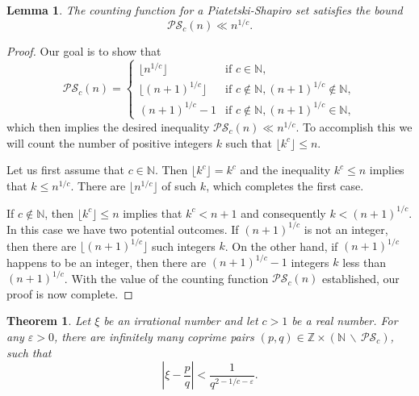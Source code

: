 \documentclass[reqno]{amsart}
\newtheorem{theorem}{Theorem}
\newtheorem{lemma}{Lemma}
\theoremstyle{definition}
\begin{document}
\begin{lemma}\label{lemma:ps_seq}
    The counting function for a Piatetski-Shapiro set satisfies the bound
    \begin{equation*}
    \mathcal{PS}_{c}(n) \ll n^{1/c}.
\end{equation*}
\end{lemma}
\begin{proof}
Our goal is to show that
\begin{equation*}
    \mathcal{PS}_{c}(n) = \begin{cases}
        \lfloor{n^{1/c}}\rfloor &\text{if } c \in \mathbb{N}, \\
        \lfloor{(n+1)^{1/c}}\rfloor &\text{if } c \not\in \mathbb{N}, (n+1)^{1/c} \not \in \mathbb{N}, \\
        (n+1)^{1/c} - 1 &\text{if } c \not\in \mathbb{N}, (n+1)^{1/c} \in \mathbb{N},
    \end{cases}
\end{equation*}
which then implies the desired inequality $\mathcal{PS}_{c}(n) \ll n^{1/c}$.  To accomplish this we will count the number of positive integers $k$ such that $\lfloor{k^{c}}\rfloor \leq n$.

Let us first assume that $c \in \mathbb{N}$.  Then $\lfloor{k^{c}}\rfloor = k^{c}$ and the inequality $k^{c} \leq n$ implies that $k \leq  n^{1/c}$.  There are $\lfloor{n^{1/c}}\rfloor$ of such $k$, which completes the first case.  

If $c \notin \mathbb{N}$, then $\lfloor{k^{c}}\rfloor \leq n$ implies that $k^{c} < n + 1$ and consequently $k < (n + 1)^{1/c}.$  In this case we have two potential outcomes.  If $(n + 1)^{1/c}$ is not an integer, then there are $\lfloor{(n + 1)^{1/c}}\rfloor$ such integers $k$.  On the other hand, if $(n + 1)^{1/c}$ happens to be an integer, then there are $(n + 1)^{1/c} - 1$ integers $k$ less than $(n + 1)^{1/c}$.  With the value of the counting function $\mathcal{PS}_{c}(n)$ established, our proof is now complete.
\end{proof}
\begin{theorem}\label{thm:piatetski-shapiro-dirichlet}
Let $\xi$ be an irrational number and let $c > 1$ be a real number.  For any $\varepsilon > 0$, there are infinitely many coprime pairs $(p,q) \in \mathbb{Z} \times (\mathbb{N}\,\backslash \, \mathcal{PS}_{c})$, such that
     \begin{equation*}
    \left\vert{\xi- \frac{p}{q}}\right\vert < \frac{1}{q^{2-1/c-\varepsilon}}.
\end{equation*} 
\end{theorem}
\end{document}
